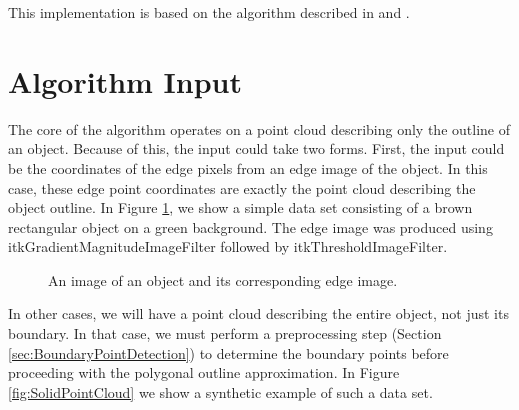 \documentclass{InsightArticle}
\begin{document}
This implementation is based on the algorithm described in \cite{WangThesis} and \cite{WangPaper}.

\section{Algorithm Input}
\label{sec:AlgorithmInput}
The core of the algorithm operates on a point cloud describing only the outline of an object. Because of this, the input could take two forms. First, the input could be the coordinates of the edge pixels from an edge image of the object. In this case, these edge point coordinates are exactly the point cloud describing the object outline. In Figure \ref{fig:EdgeImage}, we show a simple data set consisting of a brown rectangular object on a green background. The edge image was produced using itkGradientMagnitudeImageFilter followed by itkThresholdImageFilter.

\begin{figure}[H]
\centering
{}
\caption{An image of an object and its corresponding edge image.}
\label{fig:EdgeImage}
\end{figure}

In other cases, we will have a point cloud describing the entire object, not just its boundary. In that case, we must perform a preprocessing step (Section \ref{sec:BoundaryPointDetection}) to determine the boundary points before proceeding with the polygonal outline approximation. In Figure \ref{fig:SolidPointCloud} we show a synthetic example of such a data set.
\end{document}
